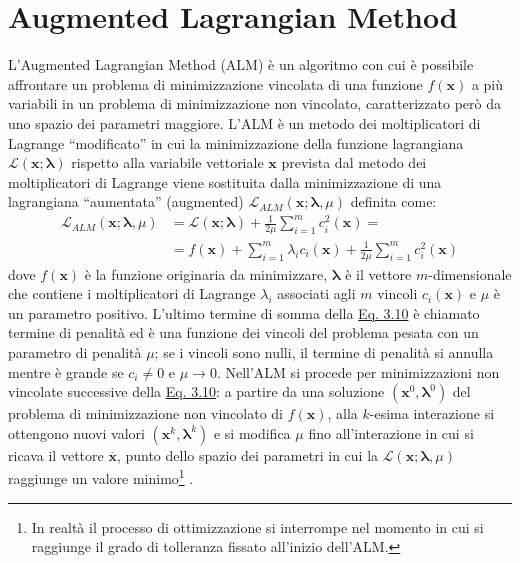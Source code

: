 \documentclass[12pt,a4paper,twoside]{report}
\newcommand{\vect}[1]{\boldsymbol{#1}}
\begin{document}
	\section{Augmented Lagrangian Method}
	L'Augmented Lagrangian Method (ALM) è un algoritmo con cui è possibile affrontare un problema di minimizzazione vincolata di una funzione $f\left(\vect{x}\right)$ a più variabili in un problema di minimizzazione non vincolato, caratterizzato però da uno spazio dei parametri maggiore. L'ALM è un metodo dei moltiplicatori di Lagrange ``modificato'' in cui la minimizzazione della funzione lagrangiana $\mathcal{L}\left(\vect{x};\vect{\lambda}\right)$ rispetto alla variabile vettoriale $\vect{x}$ prevista dal metodo dei moltiplicatori di Lagrange viene sostituita dalla minimizzazione di una lagrangiana ``aumentata'' (augmented) $\mathcal{L}_{ALM}\left(\vect{x};\vect{\lambda},\mu\right)$ definita come:
	\begin{equation}
		\begin{aligned}
			\mathcal{L}_{ALM}\left(\vect{x};\vect{\lambda},\mu\right)&=\mathcal{L}\left(\vect{x};\vect{\lambda}\right)+\frac{1}{2\mu}\sum_{i=1}^{m}c_i^2\left(\vect{x}\right)=\\
			&=f\left(\vect{x}\right)+\sum_{i=1}^{m}\lambda_ic_i\left(\vect{x}\right)+\frac{1}{2\mu}\sum_{i=1}^{m}c_i^2\left(\vect{x}\right)
		\end{aligned}
		\label{eq:augmented_lagrangian_funct}
	\end{equation}
	dove $f\left(\vect{x}\right)$ è la funzione originaria da minimizzare, $\vect{\lambda}$ è il vettore $m$-dimensionale che contiene i moltiplicatori di Lagrange $\lambda_i$ associati agli $m$ vincoli $c_i\left(\vect{x}\right)$ e $\mu$ è un parametro positivo. L'ultimo termine di somma della \hyperref[eq:augmented_lagrangian_funct]{Eq. 3.10} è chiamato termine di penalità ed è una funzione dei vincoli del problema pesata con un parametro di penalità $\mu$; se i vincoli sono nulli, il termine di penalità si annulla mentre è grande se $c_i\ne0$ e $\mu\rightarrow0$. Nell'ALM si procede per minimizzazioni non vincolate successive della \hyperref[eq:augmented_lagrangian_funct]{Eq. 3.10}: a partire da una soluzione $\left(\vect{x}^0,\vect{\lambda}^0\right)$ del problema di minimizzazione non vincolato di $f\left(\vect{x}\right)$, alla $k$-esima interazione si ottengono nuovi valori $\left(\vect{x}^k,\vect{\lambda}^k\right)$ e si modifica $\mu$ fino all'interazione in cui si ricava il vettore $\overline{\vect{x}}$, punto dello spazio dei parametri in cui la $\mathcal{L}\left(\vect{x};\vect{\lambda},\mu\right)$ raggiunge un valore minimo\footnote{In realtà il processo di ottimizzazione si interrompe nel momento in cui si raggiunge il grado di tolleranza fissato all'inizio dell'ALM.} \cite{Cho2016-st}.
	
\end{document}
